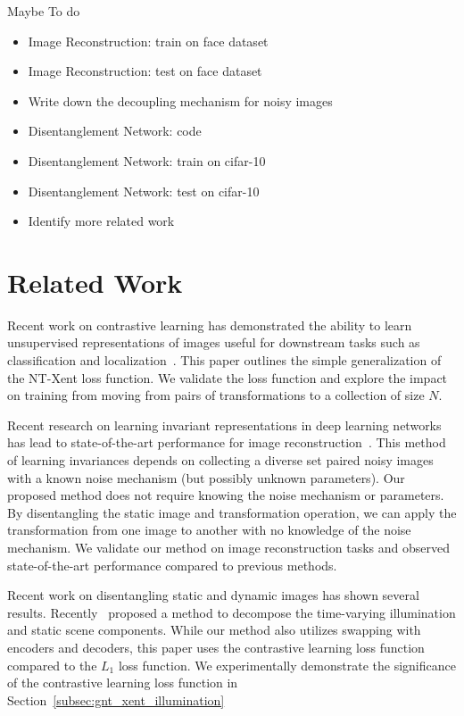 \documentclass[11pt]{article}
\begin{document}
Maybe To do 

\begin{itemize}
\item Image Reconstruction: train on face dataset
\item Image Reconstruction: test on face dataset
\item Write down the decoupling mechanism for noisy images
\item Disentanglement Network: code
\item Disentanglement Network: train on cifar-10
\item Disentanglement Network: test on cifar-10
\item Identify more related work
\end{itemize}

\section{Related Work}


Recent work on contrastive learning has demonstrated the ability to learn unsupervised representations of images useful for downstream tasks such as classification and localization~\cite{chen2020simple}. This paper outlines the simple generalization of the NT-Xent loss function. We validate the loss function and explore the impact on training from moving from pairs of transformations to a collection of size $N$. 

Recent research on learning invariant representations in deep learning networks has lead to state-of-the-art performance for image reconstruction~\cite{xia2019training}. This method of learning invariances depends on collecting a diverse set paired noisy images with a known noise mechanism (but possibly unknown parameters). Our proposed method does not require knowing the noise mechanism or parameters. By disentangling the static image and transformation operation, we can apply the transformation from one image to another with no knowledge of the noise mechanism. 
We validate our method on image reconstruction tasks and observed state-of-the-art performance compared to previous methods.


Recent work on disentangling static and dynamic images has shown several results. Recently~\cite{liu2020learning} proposed a method to decompose the time-varying illumination and static scene components. While our method also utilizes swapping with encoders and decoders, this paper uses the contrastive learning loss function compared to the $L_1$ loss function. We experimentally demonstrate the significance of the contrastive learning loss function in Section~\ref{subsec:gnt_xent_illumination}
\end{document}
